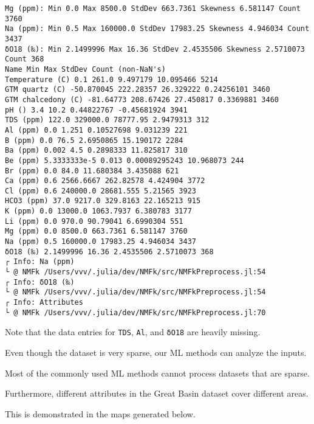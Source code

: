 \documentclass[11pt]{article}
\begin{document}
    \begin{Verbatim}[commandchars=\\\{\}]
Mg (ppm): Min 0.0 Max 8500.0 StdDev 663.7361 Skewness 6.581147 Count 3760
Na (ppm): Min 0.5 Max 160000.0 StdDev 17983.25 Skewness 4.946034 Count 3437
δO18 (‰): Min 2.1499996 Max 16.36 StdDev 2.4535506 Skewness 2.5710073 Count 368
Name Min Max StdDev Count (non-NaN's)
Temperature (C) 0.1 261.0 9.497179 10.095466 5214
GTM quartz (C) -50.870045 222.28357 26.329222 0.24256101 3460
GTM chalcedony (C) -81.64773 208.67426 27.450817 0.3369881 3460
pH () 3.4 10.2 0.44822767 -0.45681924 3941
TDS (ppm) 122.0 329000.0 78777.95 2.9479313 312
Al (ppm) 0.0 1.251 0.10527698 9.031239 221
B (ppm) 0.0 76.5 2.6950865 15.190172 2284
Ba (ppm) 0.002 4.5 0.2898333 11.825817 310
Be (ppm) 5.3333333e-5 0.013 0.00089295243 10.968073 244
Br (ppm) 0.0 84.0 11.680384 3.435088 621
Ca (ppm) 0.6 2566.6667 262.82578 4.424904 3772
Cl (ppm) 0.6 240000.0 28681.555 5.21565 3923
HCO3 (ppm) 37.0 9217.0 329.8163 22.165213 915
K (ppm) 0.0 13000.0 1063.7937 6.380783 3177
Li (ppm) 0.0 970.0 90.79041 6.6990304 551
Mg (ppm) 0.0 8500.0 663.7361 6.581147 3760
Na (ppm) 0.5 160000.0 17983.25 4.946034 3437
δO18 (‰) 2.1499996 16.36 2.4535506 2.5710073 368
┌ Info: Na (ppm)
└ @ NMFk /Users/vvv/.julia/dev/NMFk/src/NMFkPreprocess.jl:54
┌ Info: δO18 (‰)
└ @ NMFk /Users/vvv/.julia/dev/NMFk/src/NMFkPreprocess.jl:54
┌ Info: Attributes
└ @ NMFk /Users/vvv/.julia/dev/NMFk/src/NMFkPreprocess.jl:70
    \end{Verbatim}

    Note that the data entries for \texttt{TDS}, \texttt{Al}, and
\texttt{δO18} are heavily missing.

Even though the dataset is very sparse, our ML methods can analyze the
inputs.

Most of the commonly used ML methods cannot process datasets that are
sparse.

Furthermore, different attributes in the Great Basin dataset cover
different areas.

This is demonstrated in the maps generated below.
\end{document}
